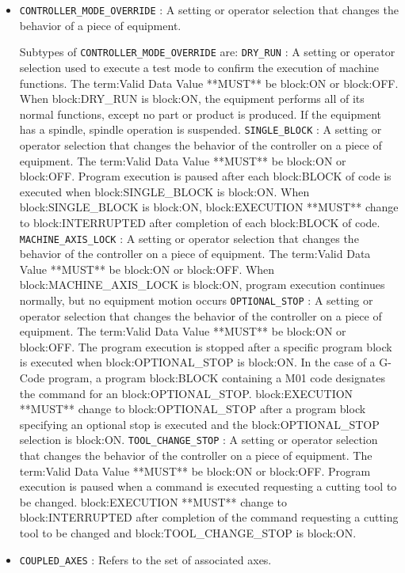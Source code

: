 \begin{itemize}
\item \texttt{CONTROLLER_MODE_OVERRIDE} : A setting or operator selection that changes the behavior of a piece of equipment. 

Subtypes of \texttt{CONTROLLER_MODE_OVERRIDE} are: 
\newline\tab \texttt{DRY_RUN} : A setting or operator selection used to execute a test mode to confirm the execution of machine functions. 
 The {term:Valid Data Value} **MUST** be {block:ON} or {block:OFF}. 
 When {block:DRY_RUN} is {block:ON}, the equipment performs all of its normal functions, except no part or product is produced.  If the equipment has a spindle, spindle operation is suspended. 
\newline\tab \texttt{SINGLE_BLOCK} : A setting or operator selection that changes the behavior of the controller on a piece of equipment. 
 The {term:Valid Data Value} **MUST** be {block:ON} or {block:OFF}.
 Program execution is paused after each {block:BLOCK} of code is executed when {block:SINGLE_BLOCK} is {block:ON}.   
 When {block:SINGLE_BLOCK} is {block:ON}, {block:EXECUTION} **MUST** change to {block:INTERRUPTED} after completion of each {block:BLOCK} of code.  
\newline\tab \texttt{MACHINE_AXIS_LOCK} : A setting or operator selection that changes the behavior of the controller on a piece of equipment. 
 The {term:Valid Data Value} **MUST** be {block:ON} or {block:OFF}. 
 When {block:MACHINE_AXIS_LOCK} is {block:ON}, program execution continues normally, but no equipment motion occurs  
\newline\tab \texttt{OPTIONAL_STOP} : A setting or operator selection that changes the behavior of the controller on a piece of equipment. 
 The {term:Valid Data Value} **MUST** be {block:ON} or {block:OFF}.
 The program execution is stopped after a specific program block is executed when {block:OPTIONAL_STOP} is {block:ON}.    
 In the case of a G-Code program, a program {block:BLOCK} containing a M01 code designates the command for an {block:OPTIONAL_STOP}. 
 {block:EXECUTION} **MUST** change to {block:OPTIONAL_STOP} after a program block specifying an optional stop is executed and the {block:OPTIONAL_STOP} selection is {block:ON}. 
\newline\tab \texttt{TOOL_CHANGE_STOP} : A setting or operator selection that changes the behavior of the controller on a piece of equipment. 
 The {term:Valid Data Value} **MUST** be {block:ON} or {block:OFF}. 
 Program execution is paused when a command is executed requesting a cutting tool to be changed. 
 {block:EXECUTION} **MUST** change to {block:INTERRUPTED} after completion of the command requesting a cutting tool to be changed and {block:TOOL_CHANGE_STOP} is {block:ON}. 
\item \texttt{COUPLED_AXES} : Refers to the set of associated axes. 


\end{itemize}
